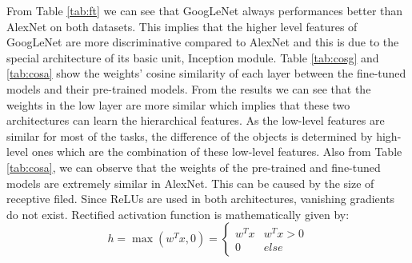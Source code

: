 From Table \ref{tab:ft} we can see that GoogLeNet always performances better than AlexNet on both datasets. This implies that the higher level features of GoogLeNet are more discriminative compared to AlexNet and this is due to the special architecture of its basic unit, Inception module. Table \ref{tab:cosg} and \ref{tab:cosa} show the weights' cosine similarity of each layer between the fine-tuned models and their pre-trained models. From the results we can see that the weights in the low layer are more similar which implies that these two architectures can learn the hierarchical features. As the low-level features are similar for most of the tasks, the difference of the objects is determined by high-level ones which are the combination of these low-level features. Also from Table \ref{tab:cosa}, we can observe that the weights of the pre-trained and fine-tuned models are extremely similar in AlexNet. This can be caused by the size of receptive filed. Since ReLUs are used in both architectures, vanishing gradients do not exist. Rectified activation function is mathematically given by:
\begin{equation}\label{relu}
h = \max ({w^T}x,0) = \left\{ {\begin{array}{*{20}{c}}
	{{w^T}x}&{{w^T}x > 0}\\
	0&{else}
	\end{array}} \right.
\end{equation}

